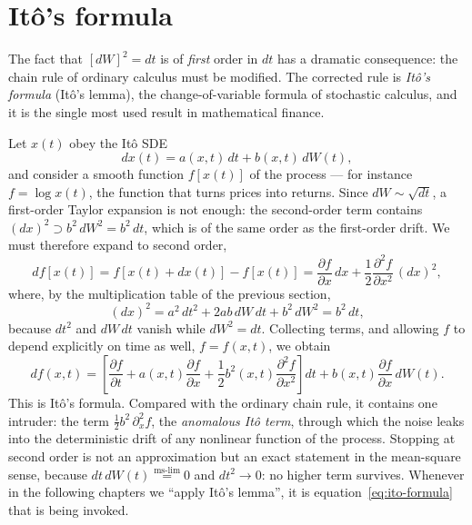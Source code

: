 \section{It\^o's formula}
\label{sec:ito-formula}

The fact that $[dW]^2=dt$ is of \emph{first} order in $dt$ has a dramatic consequence: the chain rule of ordinary calculus must be modified.
The corrected rule is \emph{It\^o's formula} (It\^o's lemma), the change-of-variable formula of stochastic calculus, and it is the single most used result in mathematical finance.

Let $x(t)$ obey the It\^o SDE
\begin{equation}
dx(t) = a(x,t)\,dt + b(x,t)\,dW(t),
\end{equation}
and consider a smooth function $f[x(t)]$ of the process --- for instance $f=\log x(t)$, the function that turns prices into returns.
Since $dW\sim\sqrt{dt}$, a first-order Taylor expansion is not enough: the second-order term contains $(dx)^2\supset b^2\,dW^2 = b^2\,dt$, which is of the same order as the first-order drift.
We must therefore expand to second order,
\begin{equation}
df[x(t)] = f[x(t)+dx(t)] - f[x(t)] = \frac{\partial f}{\partial x}\,dx + \frac{1}{2}\frac{\partial^2 f}{\partial x^2}\,(dx)^2,
\end{equation}
where, by the multiplication table of the previous section,
\begin{equation}
(dx)^2 = a^2\,dt^2 + 2ab\,dW\,dt + b^2\,dW^2 = b^2\,dt,
\end{equation}
because $dt^2$ and $dW\,dt$ vanish while $dW^2 = dt$.
Collecting terms, and allowing $f$ to depend explicitly on time as well, $f=f(x,t)$, we obtain
\begin{equation}
df(x,t) = \left[\frac{\partial f}{\partial t} + a(x,t)\frac{\partial f}{\partial x} + \frac{1}{2}b^2(x,t)\frac{\partial^2 f}{\partial x^2}\right]dt + b(x,t)\frac{\partial f}{\partial x}\,dW(t).
\label{eq:ito-formula}
\end{equation}
This is It\^o's formula.
Compared with the ordinary chain rule, it contains one intruder: the term $\tfrac{1}{2}b^2\,\partial^2_x f$, the \emph{anomalous It\^o term}, through which the noise leaks into the deterministic drift of any nonlinear function of the process.
Stopping at second order is not an approximation but an exact statement in the mean-square sense, because $dt\,dW(t)\overset{\text{ms-lim}}{=}0$ and $dt^2\to0$: no higher term survives.
Whenever in the following chapters we ``apply It\^o's lemma'', it is equation~\eqref{eq:ito-formula} that is being invoked.


